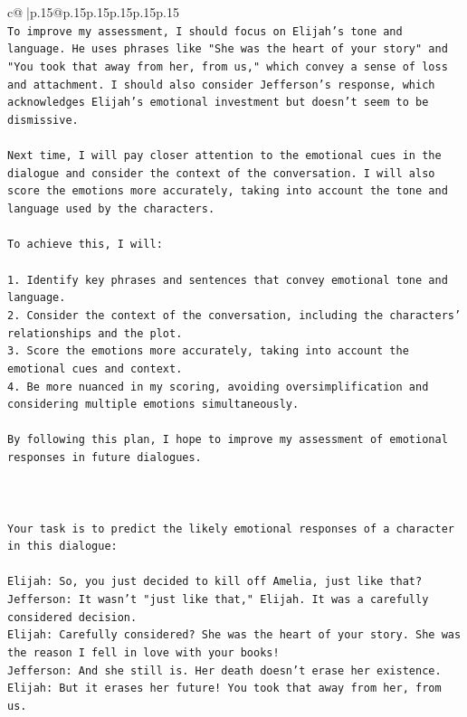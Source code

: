 \documentclass{article}
\begin{document}
{\begin{supertabular}{c@{$\;$}|p{.15\linewidth}@{}p{.15\linewidth}p{.15\linewidth}p{.15\linewidth}p{.15\linewidth}p{.15\linewidth}}
{{{\\ 
\texttt{To improve my assessment, I should focus on Elijah's tone and language. He uses phrases like "She was the heart of your story" and "You took that away from her, from us," which convey a sense of loss and attachment. I should also consider Jefferson's response, which acknowledges Elijah's emotional investment but doesn't seem to be dismissive. } \\
\\ 
\texttt{Next time, I will pay closer attention to the emotional cues in the dialogue and consider the context of the conversation. I will also score the emotions more accurately, taking into account the tone and language used by the characters.} \\
\\ 
\texttt{To achieve this, I will:} \\
\\ 
\texttt{1. Identify key phrases and sentences that convey emotional tone and language.} \\
\texttt{2. Consider the context of the conversation, including the characters' relationships and the plot.} \\
\texttt{3. Score the emotions more accurately, taking into account the emotional cues and context.} \\
\texttt{4. Be more nuanced in my scoring, avoiding oversimplification and considering multiple emotions simultaneously.} \\
\\ 
\texttt{By following this plan, I hope to improve my assessment of emotional responses in future dialogues.} \\
\\ 
\\ 
\\ 
\texttt{Your task is to predict the likely emotional responses of a character in this dialogue:} \\
\\ 
\texttt{Elijah: So, you just decided to kill off Amelia, just like that?} \\
\texttt{Jefferson: It wasn't "just like that," Elijah. It was a carefully considered decision.} \\
\texttt{Elijah: Carefully considered? She was the heart of your story. She was the reason I fell in love with your books!} \\
\texttt{Jefferson: And she still is. Her death doesn't erase her existence.} \\
\texttt{Elijah: But it erases her future! You took that away from her, from us.} \\
}}}
\end{supertabular}}
\end{document}
